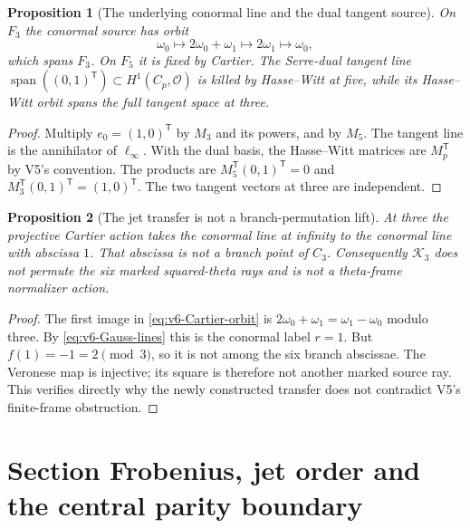 \documentclass[11pt]{article}
\newtheorem{proposition}[proposition]{Proposition}
\theoremstyle{definition}
\theoremstyle{remark}
\newcommand{\Span}{\operatorname{span}}
\begin{document}
\begin{proposition}[The underlying conormal line and the dual tangent source]
\label{prop:v6-linear-Cartier}
On $F_3$ the conormal source has orbit
\begin{equation}
 \omega_0\longmapsto2\omega_0+\omega_1
 \longmapsto2\omega_1\longmapsto\omega_0,
 \label{eq:v6-Cartier-orbit}
\end{equation}
which spans $F_3$. On $F_5$ it is fixed by Cartier. The Serre-dual tangent
line $\Span((0,1)^{\mathsf T})\subset H^1(C_p,\mathcal O)$ is killed
by Hasse--Witt at five, while its Hasse--Witt orbit spans the full
tangent space at three.
\end{proposition}
\begin{proof}
Multiply $e_0=(1,0)^{\mathsf T}$ by $M_3$ and its powers, and by
$M_5$. The tangent line is the annihilator of $\ell_\infty$.
With the dual basis, the Hasse--Witt matrices are $M_p^{\mathsf T}$ by
V5's convention. The products are
$M_5^{\mathsf T}(0,1)^{\mathsf T}=0$ and
$M_3^{\mathsf T}(0,1)^{\mathsf T}=(1,0)^{\mathsf T}$.
The two tangent vectors at three are independent.
\end{proof}

\begin{proposition}[The jet transfer is not a branch-permutation lift]
\label{prop:v6-Cartier-not-frame}
At three the projective Cartier action takes the conormal line at infinity
to the conormal line with abscissa $1$. That abscissa is not a branch point
of $C_3$. Consequently $\mathcal K_3$ does not permute the six marked
squared-theta rays and is not a theta-frame normalizer action.
\end{proposition}
\begin{proof}
The first image in \eqref{eq:v6-Cartier-orbit} is
$2\omega_0+\omega_1=\omega_1-\omega_0$ modulo three. By
\eqref{eq:v6-Gauss-lines} this is the conormal label $r=1$.
But $f(1)=-1=2\pmod3$, so it is not among the six branch abscissae.
The Veronese map is injective; its square is therefore not another marked
source ray. This verifies directly why the newly constructed transfer
does not contradict V5's finite-frame obstruction.
\end{proof}

\section{Section Frobenius, jet order and the central parity boundary}
\label{sec:v6-parity}
\end{document}
